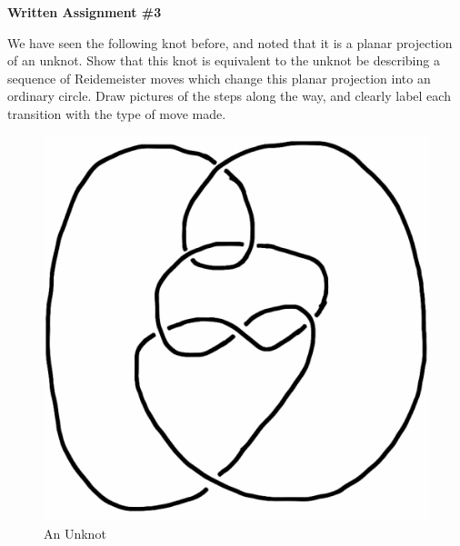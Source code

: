 \documentclass[12pt,letterpaper]{article}
\begin{document}
\setlength{\parskip}{1ex plus 0.5ex minus 0.2ex}
\setlength{\parindent}{0pt}

\pagestyle{fancy}
\lfoot{}
\rfoot{}

\begin{center}
{
\Large
\textbf{Written Assignment \#3}
}
\end{center}

We have seen the following knot before, and noted that it is a planar projection of an unknot.
Show that this knot is equivalent to the unknot be describing a sequence of Reidemeister moves which change this planar projection into an ordinary circle.
Draw pictures of the steps along the way, and clearly label each transition with the type of move made.

\vspace{1cm}



\begin{figure}[h]
    \centering
    \includegraphics[width=.7\textwidth]{knotpics/9SeptQ5b.png}
    \caption{An Unknot}
\end{figure}
\end{document}
